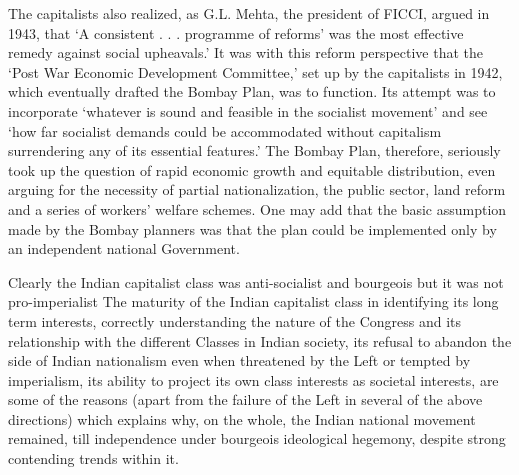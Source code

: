 The capitalists also realized, as G.L. Mehta, the president of FICCI, argued in 1943, that ‘A consistent . . . programme of reforms’ was the most effective remedy against social upheavals.’ It was with this reform perspective that the ‘Post War Economic Development Committee,’ set up by the capitalists in 1942, which eventually drafted the Bombay Plan, was to function. Its attempt was to incorporate ‘whatever is sound and feasible in the socialist movement’ and see ‘how far socialist demands could be accommodated without capitalism surrendering any of its essential features.’ The Bombay Plan, therefore, seriously took up the question of rapid economic growth and equitable distribution, even arguing for the necessity of partial nationalization, the public sector, land reform and a series of workers’ welfare schemes. One may add that the basic assumption made by the Bombay planners was that the plan could be implemented only by an independent national Government. 

Clearly the Indian capitalist class was anti-socialist and bourgeois but it was not pro-imperialist The maturity of the Indian capitalist class in identifying its long term interests, correctly understanding the nature of the Congress and its relationship with the different Classes in Indian society, its refusal to abandon the side of Indian nationalism even when threatened by the Left or tempted by imperialism, its ability to project its own class interests as societal interests, are some of the reasons (apart from the failure of the Left in several of the above directions) which explains why, on the whole, the Indian national movement remained, till independence under bourgeois ideological hegemony, despite strong contending trends within it.
